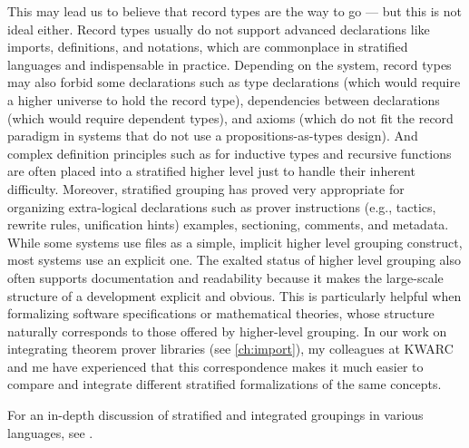 This may lead us to believe that record types are the way to go --- but this is not ideal either.
Record types usually do not support advanced declarations like imports, definitions, and notations, which are commonplace in stratified languages and indispensable in practice.
Depending on the system, record types may also forbid some declarations such as type declarations (which would require a higher universe to hold the record type), dependencies between declarations (which would require dependent types), and axioms (which do not fit the record paradigm in systems that do not use a propositions-as-types design).
And complex definition principles such as for inductive types and recursive functions are often placed into a stratified higher level just to handle their inherent difficulty.
Moreover, stratified grouping has proved very appropriate for organizing extra-logical declarations such as prover instructions (e.g., tactics, rewrite rules, unification hints) examples, sectioning, comments, and metadata.
While some systems use files as a simple, implicit higher level grouping construct, most systems use an explicit one.
The exalted status of higher level grouping also often supports documentation and readability because it makes the large-scale structure of a development explicit and obvious.
This is particularly helpful when formalizing software specifications or mathematical theories, whose structure naturally corresponds to those offered by higher-level grouping.
In our work on integrating theorem prover libraries (see \autoref{ch:import}), my colleagues at KWARC and me have experienced that this correspondence makes it much easier to compare and integrate different stratified formalizations of the same concepts.

For an in-depth discussion of stratified and integrated groupings in various languages, see \cite{MueRabKoh:tatreport18}.

